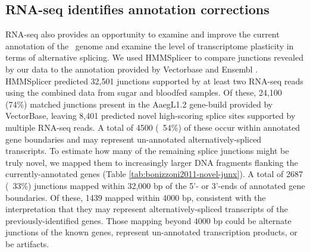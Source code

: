 \subsection{RNA-seq identifies annotation corrections}





RNA-seq also provides an opportunity to examine and improve the current annotation of the \Aa\  genome and examine the level of transcriptome plasticity in terms of alternative splicing. We used HMMSplicer \cite{Dimon2010} to compare junctions revealed by our data to the annotation provided by Vectorbase and Ensembl \cite{Lawson2009,Hubbard2002}. HMMSplicer predicted 32,501 junctions supported by at least two RNA-seq reads using the combined data from sugar and bloodfed samples. Of these, 24,100 (74\%) matched junctions present in the AaegL1.2 gene-build provided by VectorBase, leaving 8,401 predicted novel high-scoring splice sites supported by multiple RNA-seq reads. A total of 4500 (~54\%) of these occur within annotated gene boundaries and may represent un-annotated alternatively-spliced transcripts. To estimate how many of the remaining splice junctions might be truly novel, we mapped them to increasingly larger DNA fragments flanking the currently-annotated genes (Table \ref{tab:bonizzoni2011-novel-junx}). A total of 2687 (~33\%) junctions mapped within 32,000 bp of the 5'- or 3'-ends of annotated gene boundaries. Of these, 1439 mapped within 4000 bp, consistent with the interpretation that they may represent alternatively-spliced transcripts of the previously-identified genes. Those mapping beyond 4000 bp could be alternate junctions of the known genes, represent un-annotated transcription products, or be artifacts.


